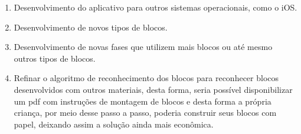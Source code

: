 \begin{enumerate}
    \item Desenvolvimento do aplicativo para outros sistemas operacionais, como o iOS. 
    
    \item Desenvolvimento de novos tipos de blocos.
    
    \item Desenvolvimento de novas fases que utilizem mais blocos ou até mesmo outros tipos de blocos.
    
    \item  Refinar o algoritmo de reconhecimento dos blocos para reconhecer blocos desenvolvidos com outros materiais, desta forma, seria possível disponibilizar um pdf com instruções de montagem de blocos e desta forma a própria criança, por meio desse passo a passo, poderia construir seus blocos com papel, deixando assim a solução ainda mais econômica.

    
\end{enumerate}










